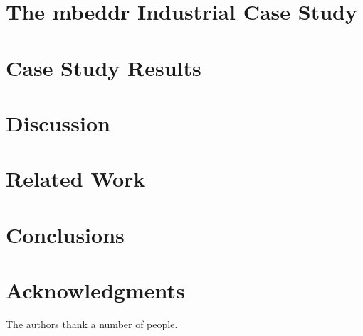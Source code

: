 \documentclass[conference]{IEEEtran}
\begin{document}
\section{The mbeddr Industrial Case Study}
\label{sec:mbeddr_case_study}


\section{Case Study Results}
\label{sec:results}


\section{Discussion}
\label{sec:discussion}
 

\section{Related Work}
\label{sec:related}


\section{Conclusions}
\label{sec:conclusion}


\section*{Acknowledgments}
The authors thank a number of people.



\end{document}

